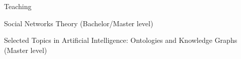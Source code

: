 \begin{rSection}{Teaching}
    \begin{description}[nosep]
        \item [\href{https://web.archive.org/web/20220707214216/https://www.uib.no/en/course/INF207}{INF207-22H}:] Social Networks Theory (Bachelor/Master level)
        \item [\href{https://web.archive.org/web/20210918132515/https://www.uib.no/en/course/INF367}{INF367-21H}:] Selected Topics in Artificial Intelligence: Ontologies and Knowledge Graphs (Master level)
    \end{description}
\end{rSection}
